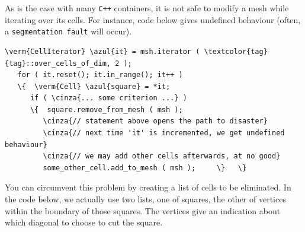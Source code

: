 As is the case with many {\tt C++} containers, it is not safe to modify a mesh while
iterating over its cells.
For instance, code below gives undefined behaviour (often, a {\small\tt segmentation fault}
will occur).

\begin{Verbatim}[commandchars=\\\{\},formatcom=\small\tt,frame=single,
   label=incorrect code !,rulecolor=\color{coment},
   baselinestretch=0.94,framesep=2mm]
   \verm{CellIterator} \azul{it} = msh.iterator ( \textcolor{tag}{tag}::over_cells_of_dim, 2 );
   for ( it.reset(); it.in_range(); it++ )
   \{  \verm{Cell} \azul{square} = *it;
      if ( \cinza{... some criterion ...} )
      \{  square.remove_from_mesh ( msh );
         \cinza{// statement above opens the path to disaster}
         \cinza{// next time 'it' is incremented, we get undefined behaviour}
         \cinza{// we may add other cells afterwards, at no good}
         some_other_cell.add_to_mesh ( msh );     \}   \}
\end{Verbatim}

You can circumvent this problem by creating a list of cells to be eliminated.
In the code below, we actually use two lists, one of squares, the other of vertices within
the boundary of those squares.
The vertices give an indication about which diagonal to choose to cut the square.

